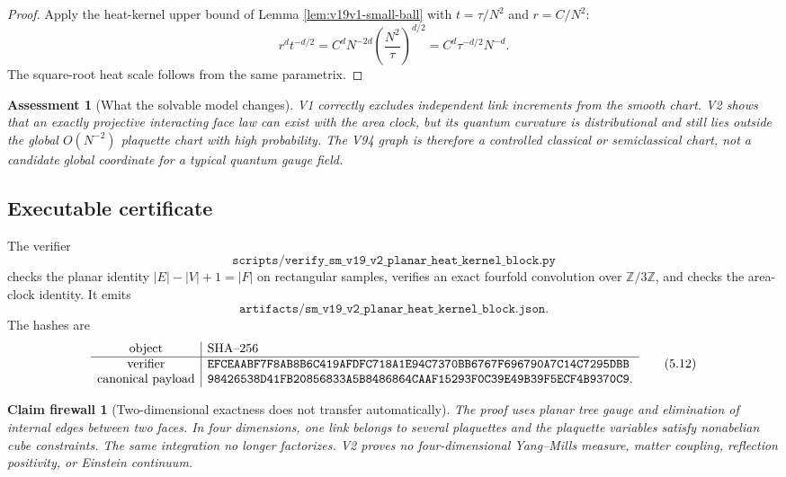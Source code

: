 \documentclass[11pt]{article}
\newtheorem{firewall}[theorem]{Claim firewall}
\newtheorem{assessment}[theorem]{Assessment}
\theoremstyle{remark}
\begin{document}
\begin{proof}
Apply the heat-kernel upper bound of Lemma
\ref{lem:v19v1-small-ball} with \(t=\tau/N^2\) and \(r=C/N^2\):
\[
 r^dt^{-d/2}
 =C^dN^{-2d}\left(\frac{N^2}{\tau}\right)^{d/2}
 =C^d\tau^{-d/2}N^{-d}.
\]
The square-root heat scale follows from the same parametrix.
\end{proof}

\begin{assessment}[What the solvable model changes]
\label{ass:v19v2-change}
V1 correctly excludes independent link increments from the smooth chart.
V2 shows that an exactly projective interacting face law can exist with the
area clock, but its quantum curvature is distributional and still lies
outside the global \(O(N^{-2})\) plaquette chart with high probability.
The V94 graph is therefore a controlled classical or semiclassical chart,
not a candidate global coordinate for a typical quantum gauge field.
\end{assessment}

\subsection{Executable certificate}

The verifier
\[
 \texttt{scripts/verify\_sm\_v19\_v2\_planar\_heat\_kernel\_block.py}
                                                                  \tag{5.10}
\]
checks the planar identity \(|E|-|V|+1=|F|\) on rectangular samples,
verifies an exact fourfold convolution over \(\mathbb Z/3\mathbb Z\), and
checks the area-clock identity.  It emits
\[
 \texttt{artifacts/sm\_v19\_v2\_planar\_heat\_kernel\_block.json}.  \tag{5.11}
\]
The hashes are
\[
\begin{array}{c|l}
\hbox{object}&\hbox{SHA--256}\\ \hline
\hbox{verifier}&
\texttt{EFCEAABF7F8AB8B6C419AFDFC718A1E94C7370BB6767F696790A7C14C7295DBB}\\
\hbox{canonical payload}&
\texttt{98426538D41FB20856833A5B8486864CAAF15293F0C39E49B39F5ECF4B9370C9}.
\end{array}                                                   \tag{5.12}
\]

\begin{firewall}[Two-dimensional exactness does not transfer automatically]
\label{fire:v19v2}
The proof uses planar tree gauge and elimination of internal edges between
two faces.  In four dimensions, one link belongs to several plaquettes and
the plaquette variables satisfy nonabelian cube constraints.  The same
integration no longer factorizes.  V2 proves no four-dimensional
Yang--Mills measure, matter coupling, reflection positivity, or Einstein
continuum.
\end{firewall}
\end{document}
